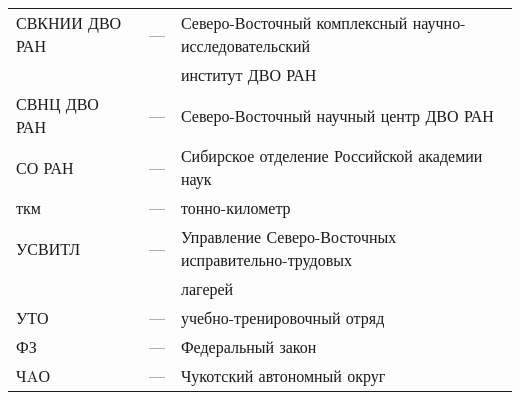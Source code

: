 \begin{changemargin}{-1.5cm}{-1cm}
\begin{tabular}{l c l}
  СВКНИИ ДВО РАН & --- & Северо-Восточный комплексный научно-исследовательский \\ & &
  институт ДВО РАН\\
  СВНЦ ДВО РАН & --- & Северо-Восточный научный центр ДВО РАН \\
  СО РАН & --- & Сибирское отделение Российской академии наук \medskip\\
  ткм & --- & тонно-километр \medskip \\
  УСВИТЛ & --- & Управление Северо-Восточных исправительно-трудовых\\ & & лагерей \\
  УТО & --- & учебно-тренировочный отряд \medskip \\ 
  ФЗ & --- & Федеральный закон \medskip \\
  ЧAО & --- & Чукотский автономный округ

\end{tabular}
\end{changemargin}
\thispagestyle{empty}
